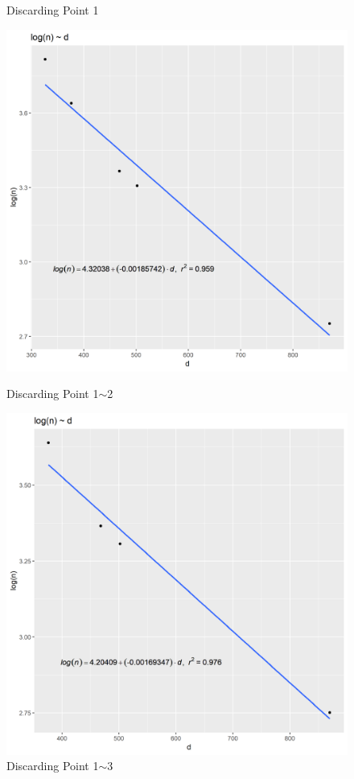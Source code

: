 \documentclass{article}
\begin{document}
\begin{figure}[H]
\begin{minipage}[t]{0.5\textwidth}
                    \caption{Discarding Point 1}
                    \label{dis.1}
                \end{minipage}
                \begin{minipage}[t]{0.5\textwidth}
                    \centering
                    \includegraphics[width = 0.8\linewidth]{../Data/discard_3.png}
                    \caption{Discarding Point 1$\sim$2}
                    \label{dis.2}
                \end{minipage}
                \begin{minipage}[t]{0.5\textwidth}
                    \centering
                    \includegraphics[width = 0.8\linewidth]{../Data/discard_4.png}
                    \caption{Discarding Point 1$\sim$3}
                    \label{dis.3}
                \end{minipage}
            \end{figure}
\end{document}
